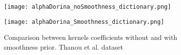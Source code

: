 \begin{figure}
  \centering
  \begin{minipage}[c]{.8\textwidth}
    \centering
    \texttt{[image: alphaDorina\_noSmoothness\_dictionary.png]}
  \end{minipage}
  \begin{minipage}[c]{.8\textwidth}
    \centering
    \texttt{[image: alphaDorina\_Smoothness\_dictionary.png]}
  \end{minipage}
  \caption{Comparison between kernels coefficients without and with smoothness prior. Thanou et al.   dataset}
  \label{fig:alphaGDDorina}
\end{figure}
